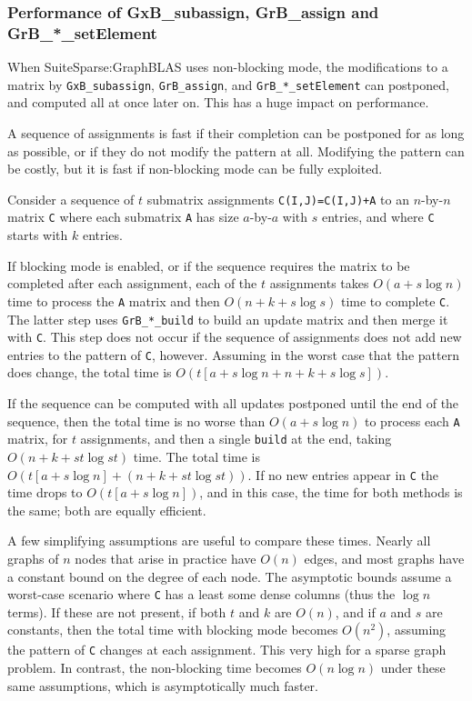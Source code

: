 \documentclass[12pt]{article}
\begin{document}
\newpage
\subsubsection{Performance of {\sf GxB\_subassign}, {\sf GrB\_assign}
and {\sf GrB\_*\_setElement}}

When SuiteSparse:GraphBLAS uses non-blocking mode, the modifications to a
matrix by \verb'GxB_subassign', \verb'GrB_assign', and \verb'GrB_*_setElement'
can postponed, and computed all at once later on.  This has a huge impact on
performance.

A sequence of assignments is fast if their completion can be postponed for as
long as possible, or if they do not modify the pattern at all.  Modifying the
pattern can be costly, but it is fast if non-blocking mode can be fully
exploited.

Consider a sequence of $t$ submatrix assignments \verb'C(I,J)=C(I,J)+A' to an
$n$-by-$n$ matrix \verb'C' where each submatrix \verb'A' has size $a$-by-$a$
with $s$ entries, and where \verb'C' starts with $k$ entries.

If blocking mode is enabled, or if the sequence requires the matrix to be
completed after each assignment, each of the $t$ assignments takes $O(a + s
\log n)$ time to process the \verb'A' matrix and then $O(n + k + s \log s)$
time to complete \verb'C'.  The latter step uses \verb'GrB_*_build' to build an
update matrix and then merge it with \verb'C'.  This step does not occur if the
sequence of assignments does not add new entries to the pattern of \verb'C',
however.  Assuming in the worst case that the pattern does change, the total
time is $O (t \left[ a + s \log n + n + k + s \log s \right] )$.

If the sequence can be computed with all updates postponed until the end of the
sequence, then the total time is no worse than $O(a + s \log n)$ to process
each \verb'A' matrix, for $t$ assignments, and then a single \verb'build' at
the end, taking $O(n + k + st \log st)$ time.  The total time is $O (t \left [a
+ s \log n \right] + (n + k + st \log st))$.  If no new entries appear in
\verb'C' the time drops to $O (t \left [a + s \log n \right])$, and in this
case, the time for both methods is the same; both are equally efficient.

A few simplifying assumptions are useful to compare these times.  Nearly all
graphs of $n$ nodes that arise in practice have $O(n)$ edges, and most graphs
have a constant bound on the degree of each node.  The asymptotic bounds assume
a worst-case scenario where \verb'C' has a least some dense columns (thus the
$\log n$ terms).  If these are not present, if both $t$ and $k$ are $O(n)$, and
if $a$ and $s$ are constants, then the total time with blocking mode becomes
$O(n^2)$, assuming the pattern of \verb'C' changes at each assignment.  This
very high for a sparse graph problem.  In contrast, the non-blocking time
becomes $O(n \log n)$ under these same assumptions, which is asymptotically
much faster.
\end{document}
